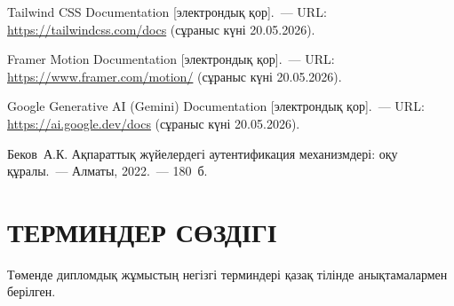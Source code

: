 \documentclass[14pt,a4paper]{extarticle}
\begin{document}
\begin{enumerate}[label={[\arabic*]}, nosep]
\item Tailwind CSS Documentation [электрондық қор].~--- URL: \url{https://tailwindcss.com/docs} (сұраныс күні 20.05.2026).
\item Framer Motion Documentation [электрондық қор].~--- URL: \url{https://www.framer.com/motion/} (сұраныс күні 20.05.2026).
\item Google Generative AI (Gemini) Documentation [электрондық қор].~--- URL: \url{https://ai.google.dev/docs} (сұраныс күні 20.05.2026).
\item Беков~А.К. Ақпараттық жүйелердегі аутентификация механизмдері: оқу құралы.~--- Алматы, 2022.~--- 180~б.
\end{enumerate}



\newpage
\section*{ТЕРМИНДЕР СӨЗДІГІ}

Төменде дипломдық жұмыстың негізгі терминдері қазақ тілінде анықтамалармен берілген.
\end{document}
